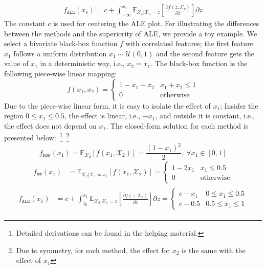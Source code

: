 \documentclass[wcp]{jmlr}
\newcommand{\Xcb}{\mathcal{X}_c}
\newcommand{\E}{\mathbb{E}}
\begin{document}
\begin{gather}
  \label{eq:ALE} f_{\mathtt{ALE}}(x_s) = c + \int_{-\infty}^{x_s} \mathbb{E}_{\Xcb|\mathcal{X}_s=z}\left[\frac{\partial f(z, \mathcal{X}_c)}{\partial z}\right] \partial z
\end{gather}
%
The constant \(c\) is used for centering the ALE plot. For
illustrating the differences between the methods and the superiority
of ALE, we provide a toy example. We select a bivariate black-box
function \(f\) with correlated features; the first feature \( x_1 \)
follows a uniform distribution \( x_1 \sim \mathcal{U}(0,1)\) and the
second feature gets the value of \(x_1\) in a deterministic way, i.e.,
\( x_2 = x_1 \). The black-box function is the following piece-wise
linear mapping:
%
\begin{equation} \label{eq:example-1-mapping} f(x_1, x_2) =
  \begin{cases} 1 - x_1 - x_2 & x_1 + x_2 \leq 1 \\ 0 & \text{otherwise}
  \end{cases}
\end{equation}
\noindent
%
Due to the piece-wise linear form, it is easy to isolate the effect of
\(x_1\); Insider the region \(0 \leq x_1 \leq 0.5\), the effect is
linear, i.e., \(-x_1\), and outside it is constant, i.e., the effect
does not depend on \(x_1\). The closed-form solution for each method
is presented below:~\footnote{Detailed derivations can be found in the
  helping material.}~\footnote{ Due to symmetry, for each method, the
  effect for \(x_2\) is the same with the effect of \(x_1\)}
%
\begin{equation}\label{eq:example-1-pdp} f_{\mathtt{PDP}}(x_1) = \mathbb{\E}_{\mathcal{X}_2} \left [f(x_1,\mathcal{X}_2) \right] = \frac{{(1-x_1)}^2}{2}, \: \forall x_1 \in [0,1]
\end{equation}
%
\begin{equation} \label{eq:example-1-mplots}
  \begin{split} f_{\mathtt{MP}}(x_1) &= \E_{\mathcal{X}_2|\mathcal{X}_1 = x_1} \left [ f(x_1, \mathcal{X}_2) \right] = \begin{cases} 1 - 2x_1 & x_1 \leq 0.5 \\ 0 &\text{otherwise}
    \end{cases}
  \end{split}
\end{equation}
%
\begin{align}\label{eq:example-1-ale}
  \begin{split} f_{\mathtt{ALE}}(x_1) &= c + \int_{z_0}^{x_1} \E_{\mathcal{X}_2|\mathcal{X}_1=z} \left [ \frac{\partial f(z, \mathcal{X}_2)}{\partial z} \right] \partial z =
     \begin{cases} c - x_1 & 0 \leq x_1 \leq 0.5\\ c - 0.5 & 0.5 \leq x_1 \leq 1
    \end{cases}
  \end{split}
\end{align}
\end{document}
